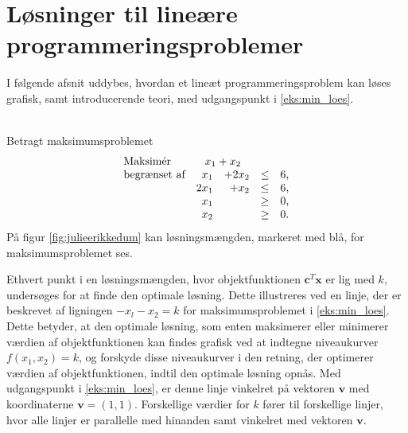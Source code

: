 \section{Løsninger til lineære programmeringsproblemer}
%
%
\label{heeeeejjulle}
%
%
I følgende afsnit uddybes, hvordan et lineæt programmeringsproblem kan løses grafisk, samt introducerende teori, med udgangspunkt i \ref{eks:min_loes}.
\\\\
\begin{eks}
\label{eks:min_loes}
Betragt maksimumsproblemet
%
\begin{align*}
\begin{array}{lrrlr}
\text{Maksimér}		&	\multicolumn{2}{c}{x_1+x_2}  &\\
\text{begrænset af}	&x_1& + 2x_2			&\leq 	& 6,\\
					&2x_1& + x_2			&\leq	& 6,\\
					&x_1&    				&\geq	& 0,\\
					&x_2&    				&\geq	& 0.\\
\end{array}
\end{align*}
%
På figur \ref{fig:julieerikkedum} kan løsningsmængden, markeret med blå, for maksimumsproblemet ses. 
%

%
\end{eks}
%
%
%
Ethvert punkt i en løsningsmængden, hvor objektfunktionen $\textbf{c}^T\textbf{x}$ er lig med $k$, undersøges for at finde den optimale løsning.
Dette illustreres ved en linje, der er beskrevet af ligningen $-x_l-x_2=k$ for maksimumsproblemet i \ref{eks:min_loes}. 
Dette betyder, at den optimale løsning, som enten maksimerer eller minimerer værdien af objektfunktionen kan findes grafisk ved at indtegne niveaukurver $f(x_1, x_2)=k$, og forskyde disse niveaukurver i den retning, der optimerer værdien af objektfunktionen, indtil den optimale løsning opnås.  
Med udgangspunkt i \ref{eks:min_loes}, er denne linje vinkelret på vektoren $\textbf{v}$ med koordinaterne $\textbf{v}=(1,1)$.
Forskellige værdier for $k$ fører til forskellige linjer, hvor alle linjer er parallelle med hinanden samt vinkelret med vektoren $\textbf{v}$. 
